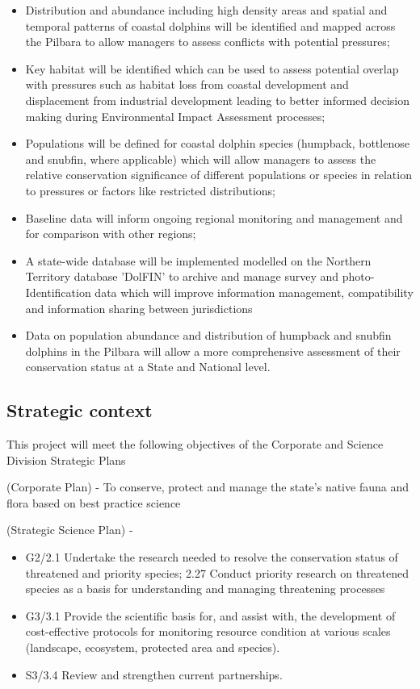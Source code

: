 \documentclass[version=last,
    paper=a4,                               %
    10pt,                                   %
    dvipsnames,
    oneside,                              %
    headings=openany,                       %
    open=any,
    BCOR=7mm,                               %
    DIV=15,     %
]{scrbook}
\providecommand{\tightlist}{\setlength{\itemsep}{0pt}\setlength{\parskip}{0pt}}
\begin{document}
\begin{itemize}
\tightlist
\item
  Distribution and abundance including high density areas and spatial
  and temporal patterns of coastal dolphins will be identified and
  mapped across the Pilbara to allow managers to assess conflicts with
  potential pressures;
\item
  Key habitat will be identified which can be used to assess potential
  overlap with pressures such as habitat loss from coastal development
  and displacement from industrial development leading to better
  informed decision making during Environmental Impact Assessment
  processes;
\item
  Populations will be defined for coastal dolphin species (humpback,
  bottlenose and snubfin, where applicable) which will allow managers to
  assess the relative conservation significance of different populations
  or species in relation to pressures or factors like restricted
  distributions;
\item
  Baseline data will inform ongoing regional monitoring and management
  and for comparison with other regions;
\item
  A state-wide database will be implemented modelled on the Northern
  Territory database 'DolFIN' to archive and manage survey and
  photo-Identification data which will improve information management,
  compatibility and information sharing between jurisdictions
\item
  Data on population abundance and distribution of humpback and snubfin
  dolphins in the Pilbara will allow a more comprehensive assessment of
  their conservation status at a State and National level.
\end{itemize}




\subsection*{Strategic context}

This project will meet the following objectives of the Corporate and
Science Division Strategic Plans

(Corporate Plan) - To conserve, protect and manage the state's native
fauna and flora based on best practice science

(Strategic Science Plan) -

\begin{itemize}
\tightlist
\item
  G2/2.1 Undertake the research needed to resolve the conservation
  status of threatened and priority species; 2.27 Conduct priority
  research on threatened species as a basis for understanding and
  managing threatening processes
\item
  G3/3.1 Provide the scientific basis for, and assist with, the
  development of cost-effective protocols for monitoring resource
  condition at various scales (landscape, ecosystem, protected area and
  species).
\item
  S3/3.4 Review and strengthen current partnerships.
\end{itemize}
\end{document}
